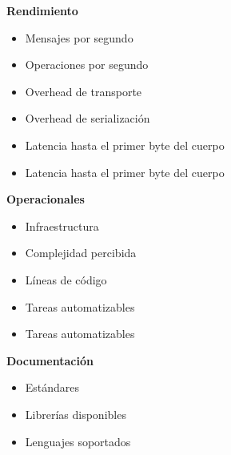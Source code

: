 \textbf{Rendimiento}

\begin{itemize}
  \item Mensajes por segundo
  \item Operaciones por segundo
  \item Overhead de transporte
  \item Overhead de serialización
  \item Latencia hasta el primer byte del cuerpo
  \item Latencia hasta el primer byte del cuerpo
\end{itemize}

\textbf{Operacionales}
\begin{itemize}
  \item Infraestructura
  \item Complejidad percibida
  \item Líneas de código
  \item Tareas automatizables
  \item Tareas automatizables
\end{itemize}

\textbf{Documentación}
\begin{itemize}
  \item Estándares
  \item Librerías disponibles
  \item Lenguajes soportados
\end{itemize}